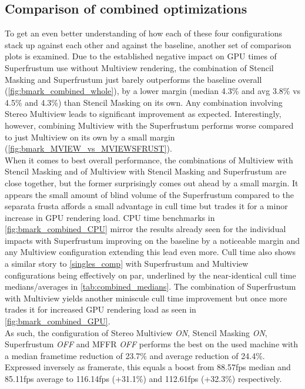 \subsection{Comparison of combined optimizations}
To get an even better understanding of how each of these four configurations stack up against each other and against the baseline, another set of comparison plots is examined. 
Due to the established negative impact on GPU times of Superfrustum use without Multiview rendering, the combination of Stencil Masking and Superfrustum just barely outperforms the baseline overall (\autoref{fig:bmark_combined_whole}), by a lower margin (median 4.3\% and avg 3.8\% vs 4.5\% and 4.3\%) than Stencil Masking on its own. Any combination involving Stereo Multiview leads to significant improvement as expected. Interestingly, however, combining Multiview with the Superfrustum performs worse compared to just Multiview on its own by a small margin (\autoref{fig:bmark_MVIEW_vs_MVIEWSFRUST}). \\
When it comes to best overall performance, the combinations of Multiview with Stencil Masking and of Multiview with Stencil Masking and Superfrustum are close together, but the former surprisingly comes out ahead by a small margin. It appears the small amount of blind volume of the Superfrustum compared to the separata frusta affords a small advantage in cull time but trades it for a minor increase in GPU rendering load. 
CPU time benchmarks in \autoref{fig:bmark_combined_CPU} mirror the results already seen for the individual impacts with Superfrustum improving on the baseline by a noticeable margin and any Multiview configuration extending this lead even more. Cull time also shows a similar story to \autoref{singles_comp} with Superfrustum and Multiview configurations being effectively on par, underlined by the near-identical cull time medians/averages in \autoref{tab:combined_medians}. The combination of Superfrustum with Multiview yields another miniscule cull time improvement but once more trades it for increased GPU rendering load as seen in \autoref{fig:bmark_combined_GPU}. \\
As such, the configuration of Stereo Multiview \textit{ON}, Stencil Masking \textit{ON}, Superfrustum \textit{OFF} and \gls{MFFR} \textit{OFF} performs the best on the used machine with a median frametime reduction of 23.7\% and average reduction of 24.4\%. Expressed inversely as framerate, this equals a boost from 88.57fps median and 85.11fps average to 116.14fps (+31.1\%) and 112.61fps (+32.3\%) respectively. 

